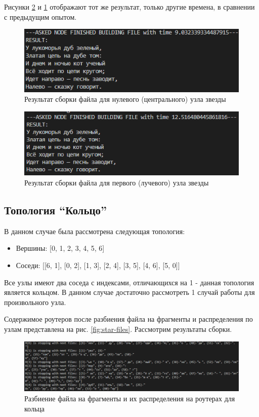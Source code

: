 Рисунки \ref{star-res-1} и \ref{star-res-0} отображают тот же результат, только другие времена, в сравнении с предыдущим опытом.

\begin{figure}[H]
    \centering
    \includegraphics[width=0.88\linewidth]{imgs/star-res-0.png}
    \caption{Результат сборки файла для нулевого (центрального) узла звезды}
    \label{star-res-0}
\end{figure}

\begin{figure}[H]
    \centering
    \includegraphics[width=0.88\linewidth]{imgs/star-res-1.png}
    \caption{Результат сборки файла для первого (лучевого) узла звезды}
    \label{star-res-1}
\end{figure}

\subsection{Топология ``Кольцо''}

В данном случае была рассмотрена следующая топология:
\begin{itemize}
    \item Вершины: [0, 1, 2, 3, 4, 5, 6]
    \item Соседи: [[6, 1], [0, 2], [1, 3], [2, 4], [3, 5], [4, 6], [5, 0]]
\end{itemize}
Все узлы имеют два соседа с индексами, отличающихся на 1 - данная топология является кольцом. В данном случае достаточно рассмотреть 1 случай работы для произвольного узла.

Содержимое роутеров после разбиения файла на фрагменты и распределения по узлам представлена на рис. \ref{fig:star-files}. Рассмотрим результаты сборки.

\begin{figure}[H]
    \centering
    \includegraphics[width=0.88\linewidth]{imgs/circle-files.png}
    \caption{Разбиение файла на фрагменты и их распределения на роутерах для кольца}
    \label{fig:circle-files}
\end{figure}

